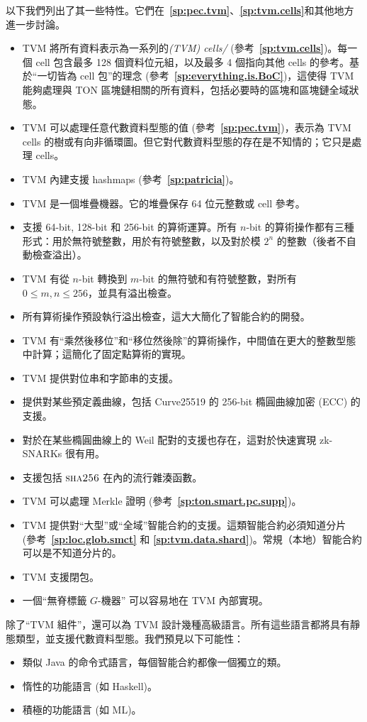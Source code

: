 \documentclass[12pt,oneside]{article}
\def\refpoint#1{{\rm\textbf{\ref{#1}}}}
\let\ptref=\refpoint
\def\opsc#1{\operatorname{\textsc{#1}}}
\def\Sha{\opsc{sha256}}
\begin{document}
以下我們列出了其一些特性。它們在~\ptref{sp:pec.tvm}、\ptref{sp:tvm.cells}和其他地方進一步討論。

\begin{itemize}
\item TVM 將所有資料表示為一系列的{\em (TVM) cells/} (參考~\ptref{sp:tvm.cells})。每一個 cell 包含最多 128 個資料位元組，以及最多 4 個指向其他 cells 的參考。基於“一切皆為 cell 包”的理念 (參考~\ptref{sp:everything.is.BoC})，這使得 TVM 能夠處理與 TON 區塊鏈相關的所有資料，包括必要時的區塊和區塊鏈全域狀態。
\item TVM 可以處理任意代數資料型態的值 (參考~\ptref{sp:pec.tvm})，表示為 TVM cells 的樹或有向非循環圖。但它對代數資料型態的存在是不知情的；它只是處理 cells。
\item TVM 內建支援 hashmaps (參考~\ptref{sp:patricia})。
\item TVM 是一個堆疊機器。它的堆疊保存 64 位元整數或 cell 參考。
\item 支援 64-bit, 128-bit 和 256-bit 的算術運算。所有 $n$-bit 的算術操作都有三種形式：用於無符號整數，用於有符號整數，以及對於模 $2^n$ 的整數（後者不自動檢查溢出）。
\item TVM 有從 $n$-bit 轉換到 $m$-bit 的無符號和有符號整數，對所有 $0\leq m,n\leq 256$，並具有溢出檢查。
\item 所有算術操作預設執行溢出檢查，這大大簡化了智能合約的開發。
\item TVM 有“乘然後移位”和“移位然後除”的算術操作，中間值在更大的整數型態中計算；這簡化了固定點算術的實現。
\item TVM 提供對位串和字節串的支援。
\item 提供對某些預定義曲線，包括 Curve25519 的 256-bit 橢圓曲線加密 (ECC) 的支援。
\item 對於在某些橢圓曲線上的 Weil 配對的支援也存在，這對於快速實現 zk-SNARKs 很有用。
\item 支援包括 $\Sha$ 在內的流行雜湊函數。
\item TVM 可以處理 Merkle 證明 (參考~\ptref{sp:ton.smart.pc.supp})。
\item TVM 提供對“大型”或“全域”智能合約的支援。這類智能合約必須知道分片 (參考~\ptref{sp:loc.glob.smct} 和 \ptref{sp:tvm.data.shard})。常規（本地）智能合約可以是不知道分片的。
\item TVM 支援閉包。
\item 一個“無脊標籤 $G$-機器” \cite{STGM} 可以容易地在 TVM 內部實現。
\end{itemize}
除了“TVM 組件”，還可以為 TVM 設計幾種高級語言。所有這些語言都將具有靜態類型，並支援代數資料型態。我們預見以下可能性：
\begin{itemize}
\item 類似 Java 的命令式語言，每個智能合約都像一個獨立的類。
\item 惰性的功能語言 (如 Haskell)。
\item 積極的功能語言 (如 ML)。
\end{itemize}
 
\end{document}
